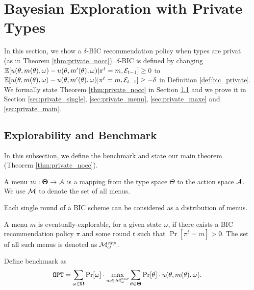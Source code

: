 
\section{Bayesian Exploration with Private Types}
\label{sec:private_nc}

In this section, we show a $\delta$-BIC recommendation policy when types are privat (as in Theorem \ref{thm:private_nocc}). $\delta$-BIC is defined by changing $\mathbb{E}[ u(\theta,m(\theta),\omega) - u(\theta,m'(\theta),\omega)| \pi^t = m, \mathcal{E}_{t-1}] \geq 0$ to $\mathbb{E}[ u(\theta,m(\theta),\omega) - u(\theta,m'(\theta),\omega)| \pi^t = m, \mathcal{E}_{t-1}] \geq -\delta$ in Definition \ref{def:bic_private}. We formally state Theorem \ref{thm:private_nocc} in Section \ref{sec:private_bench} and we prove it in Section \ref{sec:private_single}, \ref{sec:private_menu}, \ref{sec:private_maxe} and \ref{sec:private_main}.

\subsection{Explorability and Benchmark}
\label{sec:private_bench}
In this subsection, we define the benchmark and state our main theorem (Theorem \ref{thm:private_nocc}). 

\begin{definition}
A menu $m: \bold{\Theta} \rightarrow \mathcal{A}$ is a mapping from the type space $\varTheta$ to the action space $\mathcal{A}$. We use $\mathcal{M}$ to denote the set of all menus.
\end{definition}

\begin{claim}
Each single round of a BIC scheme can be considered as a distribution of menus.
\end{claim}

\begin{definition}
\label{def:private_exp}
A menu $m$ is eventually-explorable, for a given state $\omega$, if there exists a BIC recommendation policy $\pi$ and some round $t$ such that $\Pr[\pi^t= m]> 0$. The set of all such menus is denoted as $\mathcal{M}_{\omega}^{exp}$.
\end{definition}

\begin{definition}[Benchmark]
Define benchmark as 
\[
\mathtt{OPT} = \sum_{\omega\in \bold{\Omega}} \Pr[\omega] \cdot\max_{m \in \mathcal{M}_{\omega}^{exp}}\sum_{\theta \in \bold{\Theta}} \Pr[\theta] \cdot  u(\theta, m(\theta), \omega).
\]
\end{definition}

